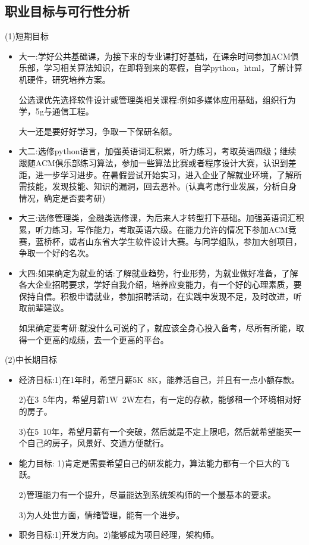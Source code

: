 \documentclass{article}
\begin{document}
\subsection{职业目标与可行性分析}
(1)短期目标\par
\begin{itemize}
	\item 大一:学好公共基础课，为接下来的专业课打好基础，在课余时间参加ACM俱乐部，学习相关算法知识，在即将到来的寒假，自学python，html，了解计算机硬件，研究培养方案。\par
	公选课优先选择软件设计或管理类相关课程:例如多媒体应用基础，组织行为学，5g与通信工程。\par
	大一还是要好好学习，争取一下保研名额。\par
	\item 大二:选修python语言，加强英语词汇积累，听力练习，考取英语四级；继续跟随ACM俱乐部练习算法，参加一些算法比赛或者程序设计大赛，认识到差距，进一步学习进步。在暑假尝试开始实习，进入企业了解就业环境，了解所需技能，发现技能、知识的漏洞，回去恶补。(认真考虑行业发展，分析自身情况，确定是否要考研)\par
	
	\item 大三:选修管理类，金融类选修课，为后来人才转型打下基础。加强英语词汇积累，听力练习，写作能力，考取英语六级。在能力允许的情况下参加ACM竞赛，蓝桥杯，或者山东省大学生软件设计大赛。与同学组队，参加大创项目，争取一个好的名次。\par
	\item 大四:如果确定为就业的话:了解就业趋势，行业形势，为就业做好准备，了解各大企业招聘要求，学好自我介绍，培养应变能力，有一个好的心理素质，要保持自信。积极申请就业，参加招聘活动，在实践中发现不足，及时改进，听取前辈建议。\par
	如果确定要考研:就没什么可说的了，就应该全身心投入备考，尽所有所能，取得一个更高的成绩，去一个更高的平台。\par
\end{itemize}
\par
(2)中长期目标
\begin{itemize}
    \item 经济目标:1)在1年时，希望月薪5K~8K，能养活自己，并且有一点小额存款。\par
    			   2)在3~5年内，希望月薪1W~2W左右，有一定的存款，能够租一个环境相对好的房子。\par
    			   3)在5~10年，希望月薪有一个突破，然后就是不定上限吧，然后就希望能买一个自己的房子，风景好、交通方便就行。\par
    \item 能力目标:
    			  1)肯定是需要希望自己的研发能力，算法能力都有一个巨大的飞跃。\par
    			  2)管理能力有一个提升，尽量能达到系统架构师的一个最基本的要求。\par
    			  3)为人处世方面，情绪管理，能有一个进步。\par
    \item 职务目标:1)开发方向。2)能够成为项目经理，架构师。\par
\end{itemize}
\end{document}

